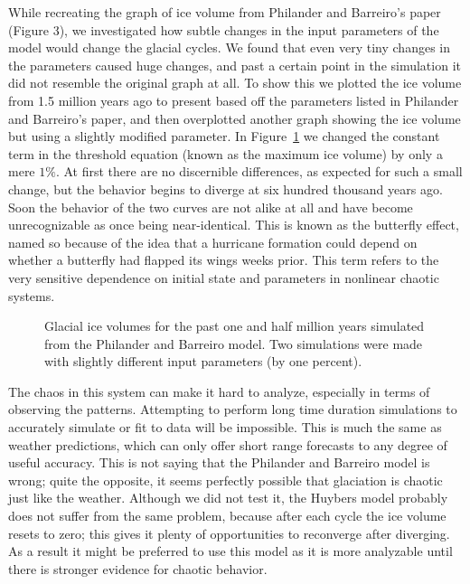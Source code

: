\documentclass[11pt]{article}
\begin{document}
While recreating the graph of ice volume from Philander and Barreiro's paper (Figure 3), we investigated how subtle changes in the input parameters of the model would change the glacial cycles.
We found that even very tiny changes in the parameters caused huge changes, and past a certain point in the simulation it did not resemble the original graph at all.
To show this we plotted the ice volume from 1.5 million years ago to present based off the parameters listed in Philander and Barreiro's paper, and then overplotted another graph showing the ice volume but using a slightly modified parameter.
In Figure~\ref{alpha} we changed the constant term in the threshold equation (known as the maximum ice volume) by only a mere $1\%$.
At first there are no discernible differences, as expected for such a small change, but the behavior begins to diverge at six hundred thousand years ago.
Soon the behavior of the two curves are not alike at all and have become unrecognizable as once being near-identical.
This is known as the butterfly effect, named so because of the idea that a hurricane formation could depend on whether a butterfly had flapped its wings weeks prior.
This term refers to the very sensitive dependence on initial state and parameters in nonlinear chaotic systems.

\begin{figure}
  \centering
  
  \caption{Glacial ice volumes for the past one and half million years simulated from the Philander and Barreiro model. Two simulations were made with slightly different input parameters (by one percent).}
  \label{alpha}
\end{figure}

The chaos in this system can make it hard to analyze, especially in terms of observing the patterns.
Attempting to perform long time duration simulations to accurately simulate or fit to data will be impossible.
This is much the same as weather predictions, which can only offer short range forecasts to any degree of useful accuracy.
This is not saying that the Philander and Barreiro model is wrong; quite the opposite, it seems perfectly possible that glaciation is chaotic just like the weather.
Although we did not test it, the Huybers model probably does not suffer from the same problem, because after each cycle the ice volume resets to zero; this gives it plenty of opportunities to reconverge after diverging.
As a result it might be preferred to use this model as it is more analyzable until there is stronger evidence for chaotic behavior.
\end{document}
